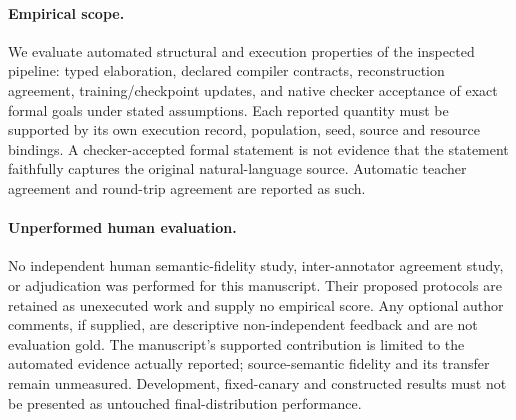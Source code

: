 \paragraph{Empirical scope.}
We evaluate automated structural and execution properties of the inspected
pipeline: typed elaboration, declared compiler contracts, reconstruction
agreement, training/checkpoint updates, and native checker acceptance of exact
formal goals under stated assumptions. Each reported quantity must be supported
by its own execution record, population, seed, source and resource bindings.
A checker-accepted formal statement is not evidence that the statement faithfully
captures the original natural-language source. Automatic teacher agreement and
round-trip agreement are reported as such.
\paragraph{Unperformed human evaluation.}
No independent human semantic-fidelity study, inter-annotator agreement study,
or adjudication was performed for this manuscript. Their proposed protocols
are retained as unexecuted work and supply no empirical score. Any optional
author comments, if supplied, are descriptive non-independent feedback and are
not evaluation gold. The manuscript's supported contribution is limited to the
automated evidence actually reported; source-semantic fidelity and its transfer
remain unmeasured. Development, fixed-canary and constructed results must not
be presented as untouched final-distribution performance.
